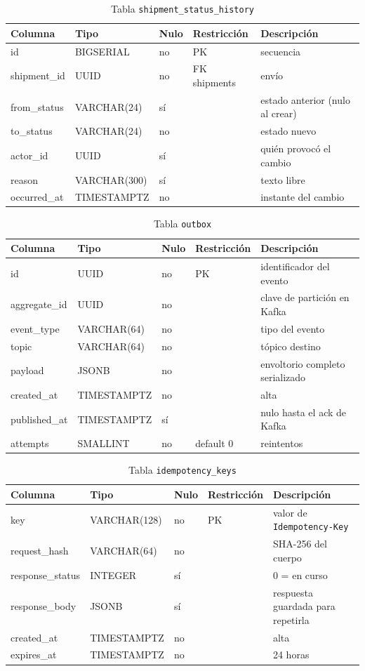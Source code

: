 \documentclass[10pt,letterpaper,twocolumn,oneside]{report}
\newcommand{\pkg}[1]{\texttt{#1}}
\begin{document}
\begin{longtable}{@{}L{3.2cm}L{3.2cm}L{1.1cm}L{3.4cm}L{3.9cm}@{}}
\caption{Tabla \pkg{shipment\_status\_history}}\\
\toprule
\textbf{Columna} & \textbf{Tipo} & \textbf{Nulo} & \textbf{Restricción} & \textbf{Descripción}\\
\midrule
\endhead
id & BIGSERIAL & no & PK & secuencia\\
shipment\_id & UUID & no & FK shipments & envío\\
from\_status & VARCHAR(24) & sí & & estado anterior (nulo al crear)\\
to\_status & VARCHAR(24) & no & & estado nuevo\\
actor\_id & UUID & sí & & quién provocó el cambio\\
reason & VARCHAR(300) & sí & & texto libre\\
occurred\_at & TIMESTAMPTZ & no & & instante del cambio\\
\bottomrule
\end{longtable}

\begin{longtable}{@{}L{3.2cm}L{3.2cm}L{1.1cm}L{3.4cm}L{3.9cm}@{}}
\caption{Tabla \pkg{outbox}}\\
\toprule
\textbf{Columna} & \textbf{Tipo} & \textbf{Nulo} & \textbf{Restricción} & \textbf{Descripción}\\
\midrule
\endhead
id & UUID & no & PK & identificador del evento\\
aggregate\_id & UUID & no & & clave de partición en Kafka\\
event\_type & VARCHAR(64) & no & & tipo del evento\\
topic & VARCHAR(64) & no & & tópico destino\\
payload & JSONB & no & & envoltorio completo serializado\\
created\_at & TIMESTAMPTZ & no & & alta\\
published\_at & TIMESTAMPTZ & sí & & nulo hasta el ack de Kafka\\
attempts & SMALLINT & no & default 0 & reintentos\\
\bottomrule
\end{longtable}

\begin{longtable}{@{}L{3.2cm}L{3.2cm}L{1.1cm}L{3.4cm}L{3.9cm}@{}}
\caption{Tabla \pkg{idempotency\_keys}}\\
\toprule
\textbf{Columna} & \textbf{Tipo} & \textbf{Nulo} & \textbf{Restricción} & \textbf{Descripción}\\
\midrule
\endhead
key & VARCHAR(128) & no & PK & valor de \pkg{Idempotency-Key}\\
request\_hash & VARCHAR(64) & no & & SHA-256 del cuerpo\\
response\_status & INTEGER & sí & & 0 = en curso\\
response\_body & JSONB & sí & & respuesta guardada para repetirla\\
created\_at & TIMESTAMPTZ & no & & alta\\
expires\_at & TIMESTAMPTZ & no & & 24 horas\\
\bottomrule
\end{longtable}
\end{document}
